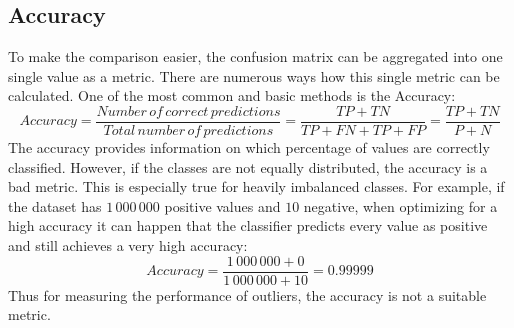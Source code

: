 \subsection{Accuracy}
To make the comparison easier, the confusion matrix can be aggregated into one single value as a metric. There are numerous ways how this single metric can be calculated. One of the most common and basic methods is the Accuracy:
\begin{equation}
    Accuracy = \frac{Number\,of\,correct\,predictions}{Total\,number\,of\,predictions} = \frac{TP + TN}{TP + FN + TP + FP} = \frac{TP + TN}{P + N}
\end{equation}
The accuracy provides information on which percentage of values are correctly classified. However, if the classes are not equally distributed, the accuracy is a bad metric. This is especially true for heavily imbalanced classes. For example, if the dataset has $1\,000\,000$ positive values and $10$ negative, when optimizing for a high accuracy it can happen that the classifier predicts every value as positive and still achieves a very high accuracy:
\begin{equation}
    Accuracy = \frac{1\,000\,000 + 0}{1\,000\,000 + 10} = 0.99999
\end{equation}
Thus for measuring the performance of outliers, the accuracy is not a suitable metric.


